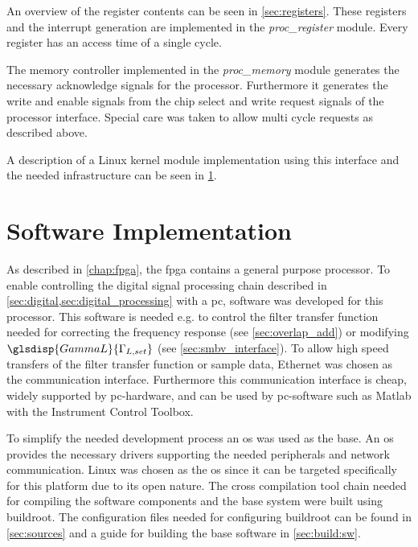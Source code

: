 \documentclass[12pt,a4paper,parskip=full,abstract=true,BCOR=12mm,twoside,open=right]{scrreprt}
\def\device#1{\textit{#1}}
\begin{document}
An overview of the register contents can be seen in \cref{sec:registers}. These
registers and the interrupt generation are implemented in the \device{proc\_register}
module. Every register has an access time of a single cycle.

The memory controller implemented in the \device{proc\_memory} module generates
the necessary acknowledge signals for the processor. Furthermore it generates the
write and enable signals from the chip select and write request signals of the
processor interface. Special care was taken to allow multi cycle requests as
described above.

A description of a Linux kernel module implementation using this interface
and the needed infrastructure can be seen in \cref{chap:software}.


\chapter{Software Implementation}
\label{chap:software}

As described in \cref{chap:fpga}, the \gls{fpga} contains a general
purpose processor. To enable controlling the digital signal processing chain
described in \cref{sec:digital,sec:digital_processing} with a \gls{pc},
software was developed for this processor. This software is needed e.g. to control the
filter transfer function needed for correcting the frequency response (see
\cref{sec:overlap_add}) or modifying $\glsdisp{GammaL}{\Gamma_{L,set}}$ (see
\cref{sec:smbv_interface}). To allow high speed transfers of the filter
transfer function or sample data, Ethernet was chosen as the communication
interface. Furthermore this communication interface is cheap, widely supported
by \gls{pc}-hardware, and can be used by \gls{pc}-software such as Matlab with the
Instrument Control Toolbox.

To simplify the needed development process an \gls{os} was used as the base. An
\gls{os} provides the necessary drivers supporting the needed peripherals and
network communication. Linux was chosen as the \gls{os} since it can be targeted
specifically for this platform due to its open nature. The cross compilation tool
chain needed for compiling the software
components and the base system were built using buildroot\cite{buildroot}. The
configuration files needed for configuring buildroot can be found in
\cref{sec:sources} and a guide for building the base software in \cref{sec:build:sw}.
\end{document}
